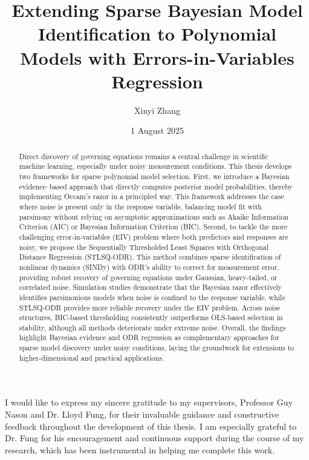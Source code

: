 \documentclass{statsmsc}
\title{Extending Sparse Bayesian Model Identification to Polynomial Models with Errors-in-Variables Regression}
\author{Xinyi Zhang}
\date{1 August 2025}
\begin{document}
\maketitle

\declaration 

\begin{acknowledgements}
    I would like to express my sincere gratitude to my supervisors, Professor Guy Nason and Dr. Lloyd Fung, for their invaluable guidance and constructive feedback throughout the development of this thesis. I am especially grateful to Dr. Fung for his encouragement and continuous support during the course of my research, which has been instrumental in helping me complete this work.
\end{acknowledgements}

\mainmatter


\begin{abstract}
    Direct discovery of governing equations remains a central challenge in scientific machine learning, especially under noisy measurement conditions. This thesis develops two frameworks for sparse polynomial model selection. First, we introduce a Bayesian evidence–based approach that directly computes posterior model probabilities, thereby implementing Occam’s razor in a principled way. This framework addresses the case where noise is present only in the response variable, balancing model fit with parsimony without relying on asymptotic approximations such as Akaike Information Criterion (AIC) or Bayesian Information Criterion (BIC). Second, to tackle the more challenging error-in-variables (EIV) problem where both predictors and responses are noisy, we propose the Sequentially Thresholded Least Squares with Orthogonal Distance Regression (STLSQ-ODR). This method combines sparse identification of nonlinear dynamics (SINDy) with ODR’s ability to correct for measurement error, providing robust recovery of governing equations under Gaussian, heavy-tailed, or correlated noise. 
    Simulation studies demonstrate that the Bayesian razor effectively identifies parsimonious models when noise is confined to the response variable, while STLSQ-ODR provides more reliable recovery under the EIV problem. 
    Across noise structures, BIC-based thresholding consistently outperforms OLS-based selection in stability, although all methods deteriorate under extreme noise. Overall, the findings highlight Bayesian evidence and ODR regression as complementary approaches for sparse model discovery under noisy conditions, laying the groundwork for extensions to higher-dimensional and practical applications.
\end{abstract}
\end{document}
